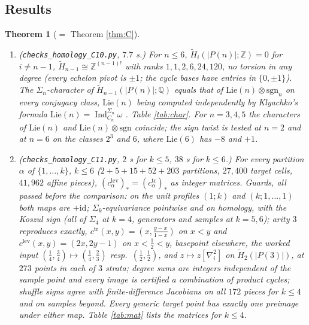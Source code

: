 \documentclass[11pt]{amsart}
\newtheorem{theorem}[subsection]{Theorem}
\theoremstyle{definition}
\theoremstyle{remark}
\newcommand{\id}{\mathrm{id}}
\newcommand{\Lev}{\mathrm{lev}}
\newcommand{\tr}{\mathrm{tr}}
\newcommand{\Z}{\mathbb{Z}}
\newcommand{\Q}{\mathbb{Q}}
\newcommand{\sgn}{\mathrm{sgn}}
\newcommand{\Hred}{\widetilde{H}}
\newcommand{\Ind}{\operatorname{Ind}}
\begin{document}
\subsection{Results}
\begin{theorem}[$=$ Theorem \ref{thm:C}]\label{thm:C2}
\leavevmode
\begin{enumerate}[label=(\roman*),leftmargin=2em]
\item (\texttt{checks\_homology\_C10.py}, $7.7$ s.) For $n\leq6$, $\Hred_i(|P(n)|;\Z)=0$ for $i\neq n-1$, $\Hred_{n-1}\cong\Z^{(n-1)!}$ with ranks $1,1,2,6,24,120$, no torsion in any degree (every echelon pivot is $\pm1$; the cycle bases have entries in $\{0,\pm1\}$). The $\Sigma_n$-character of $\Hred_{n-1}(|P(n)|;\Q)$ equals that of $\mathrm{Lie}(n)\otimes\sgn_n$ on every conjugacy class, $\mathrm{Lie}(n)$ being computed independently by Klyachko's formula $\mathrm{Lie}(n)=\Ind_{C_n}^{\Sigma_n}\omega$ \cite{Kly}. Table \ref{tab:char}. For $n=3,4,5$ the characters of $\mathrm{Lie}(n)$ and $\mathrm{Lie}(n)\otimes\sgn$ coincide; the sign twist is tested at $n=2$ and at $n=6$ on the classes $2^3$ and $6$, where $\mathrm{Lie}(6)$ has $-8$ and $+1$.
\item (\texttt{checks\_homology\_C11.py}, $2$ s for $k\leq5$, $38$ s for $k\leq6$.) For every partition $\alpha$ of $\{1,\dots,k\}$, $k\leq6$ ($2+5+15+52+203$ partitions, $27{,}400$ target cells, $41{,}962$ affine pieces), $(c^{\Lev}_\alpha)_*=(c^{\tr}_\alpha)_*$ as integer matrices. Guards, all passed before the comparison: on the unit profiles $(1;k)$ and $(k;1,\dots,1)$ both maps are $+\id$; $\Sigma_k$-equivariance pointwise and on homology, with the Koszul sign (all of $\Sigma_4$ at $k=4$, generators and samples at $k=5,6$); arity $3$ reproduces \cite[Appendix B]{Cl2} exactly, $c^{\tr}(x,y)=(x,\tfrac{y-x}{1-x})$ on $x<y$ and $c^{\Lev}(x,y)=(2x,2y-1)$ on $x<\tfrac12<y$, basepoint elsewhere, the worked input $(\tfrac14,\tfrac34)\mapsto(\tfrac14,\tfrac23)$ resp.\ $(\tfrac12,\tfrac12)$, and $z\mapsto z[\nabla^2_i]$ on $\Hred_2(|P(3)|)$, at $273$ points in each of $3$ strata; degree sums are integers independent of the sample point and every image is certified a combination of product cycles; shuffle signs agree with finite-difference Jacobians on all $172$ pieces for $k\leq4$ and on samples beyond. Every generic target point has exactly one preimage under either map. Table \ref{tab:mat} lists the matrices for $k\leq4$.

\end{enumerate}
\end{theorem}
\end{document}
